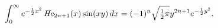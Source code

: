 \[\int_{0}^{\infty}e^{-\frac{1}{2}x^{2}}\mathop{\mathit{He}_{2n+1}\/}\nolimits\!%
\left(x\right)\mathop{\sin\/}\nolimits\!\left(xy\right)dx=(-1)^{n}\sqrt{\tfrac%
{1}{2}\pi}y^{2n+1}e^{-\frac{1}{2}y^{2}},\]